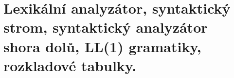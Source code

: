 \section[PAL - analyzátory, gramatiky]{Lexikální analyzátor, syntaktický strom, syntaktický analyzátor shora dolů, LL(1) gramatiky, rozkladové tabulky.}